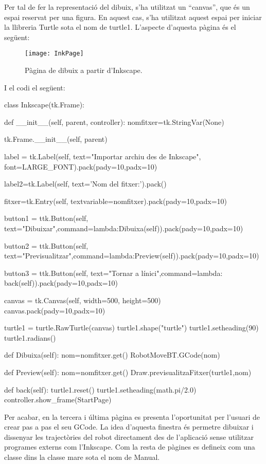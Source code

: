 Per tal de fer la representació del dibuix, s’ha utilitzat un “canvas”, que és un espai reservat per una figura. En aquest cas, s’ha utilitzat aquest espai per iniciar la llibreria Turtle sota el nom de turtle1. L’aspecte d’aquesta pàgina és el següent:

\begin{figure}[H]
	\centering
	\texttt{[image: InkPage]}
	\caption{Pàgina de dibuix a partir d'Inkscape.}
	\label{fig:InkPage}
\end{figure}

I el codi el següent:

\begin{python}
	class Inkscape(tk.Frame):
	
	def __init__(self, parent, controller):
	nomfitxer=tk.StringVar(None)
	
	tk.Frame.__init__(self, parent)
	
	
	label = tk.Label(self, text="Importar archiu des de Inkscape", font=LARGE_FONT).pack(pady=10,padx=10)
	
	label2=tk.Label(self, text='Nom del fitxer:').pack()
	
	fitxer=tk.Entry(self, textvariable=nomfitxer).pack(pady=10,padx=10)
	
	button1 = ttk.Button(self, text="Dibuixar",command=lambda:Dibuixa(self)).pack(pady=10,padx=10)
	
	button2 = ttk.Button(self, text="Previsualitzar",command=lambda:Preview(self)).pack(pady=10,padx=10)
	
	button3 = ttk.Button(self, text="Tornar a l\'inici",command=lambda: back(self)).pack(pady=10,padx=10)
	
	canvas = tk.Canvas(self, width=500, height=500)
	canvas.pack(pady=10,padx=10)
	
	turtle1 = turtle.RawTurtle(canvas)
	turtle1.shape("turtle")
	turtle1.setheading(90)
	turtle1.radians()
	
	def Dibuixa(self):
	nom=nomfitxer.get()
	RobotMoveBT.GCode(nom)
	
	def Preview(self):
	nom=nomfitxer.get()
	Draw.previsualitzaFitxer(turtle1,nom)
	
	def back(self):
	turtle1.reset()
	turtle1.setheading(math.pi/2.0)
	controller.show_frame(StartPage)
\end{python}

Per acabar, en la tercera i última pàgina es presenta l'oportunitat per l’usuari de crear pas a pas el seu GCode. La idea d’aquesta finestra és permetre dibuixar i dissenyar les trajectòries del robot directament des de l’aplicació sense utilitzar programes externs com l’Inkscape. Com la resta de pàgines es defineix com una classe dins la classe mare sota el nom de Manual. 

